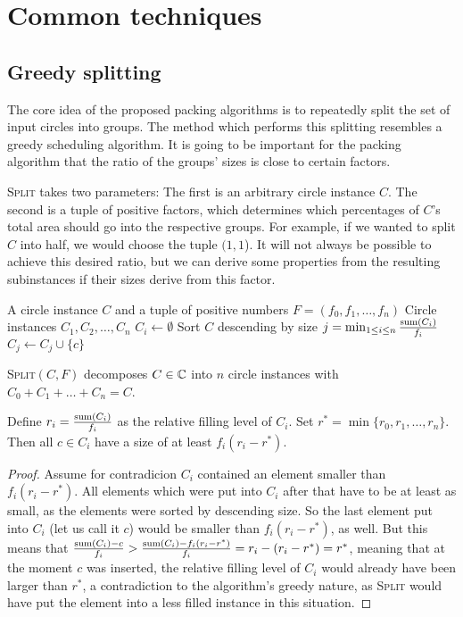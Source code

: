 \documentclass[%
    a4paper,              %
    style=print,          %
    bibliography=totoc,   %
    nexus,                %
    lnum,                 %
    extramargin,          %
]{tubsbook}
\begin{document}
\chapter{Common techniques}

\section{Greedy splitting}

The core idea of the proposed packing algorithms is to repeatedly split the set of input circles into groups. The method which performs this splitting resembles a greedy scheduling algorithm. It is going to be important for the packing algorithm that the ratio of the groups' sizes is close to certain factors.

\textsc{Split} takes two parameters: The first is an arbitrary circle instance $C$. The second is a tuple of positive factors, which determines which percentages of $C$'s total area should go into the respective groups. For example, if we wanted to split $C$ into half, we would choose the tuple $(1,1$).
It will not always be possible to achieve this desired ratio, but we can derive some properties from the resulting subinstances if their sizes derive from this factor.

\begin{algorithmic}
    \Require A circle instance $C$ and a tuple of positive numbers $F = (f_0, f_1, \dots, f_n)$
    \Ensure Circle instances $C_1, C_2, \dots, C_n$
            \State $C_i \gets \emptyset$
        \EndFor
        \State Sort $C$ descending by size
            \State $j = \min_{1 \le i \le n} \frac{\operatorname{sum}(C_i)}{f_i}$
            \State $C_j \gets C_j \cup \{c\}$
        \EndFor
    \EndFunction
\end{algorithmic}

\begin{theorem}\label{th:split-property}
    \textsc{Split}$(C,F)$ decomposes $C \in \mathbb{C}$ into $n$ circle instances with $C_0 + C_1 + \dots + C_n = C$.

    Define $r_i = \frac{\operatorname{sum}(C_i)}{f_i}$ as the relative filling level of $C_i$.
    Set $r^* = \min\{r_0,r_1,\dots,r_n\}$.
    Then all $c \in C_i$ have a size of at least $f_i(r_i-r^*)$.
\end{theorem}

\begin{proof}
    Assume for contradicion $C_i$ contained an element smaller than $f_i(r_i-r^*)$. All elements which were put into $C_i$ after that have to be at least as small, as the elements were sorted by descending size. So the last element put into $C_i$ (let us call it $c$) would be smaller than $f_i(r_i-r^*)$, as well.
    But this means that $\frac{\operatorname{sum}(C_i) - c}{f_i} > \frac{\operatorname{sum}(C_i) - f_i(r_i-r^*)}{f_i} = r_i - (r_i-r^*) = r^*$, meaning that at the moment $c$ was inserted, the relative filling level of $C_i$ would already have been larger than $r^*$, a contradiction to the algorithm's greedy nature, as \textsc{Split} would have put the element into a less filled instance in this situation.
\end{proof}
\end{document}

